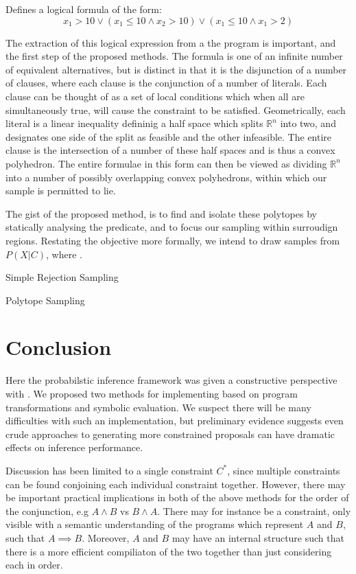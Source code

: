 Defines a logical formula of the form:
\begin{equation}
x_1 > 10 \lor (x_1 \le 10 \land x_2 > 10) \lor (x_1 \le 10 \land x_1 > 2)
\end{equation}

The extraction of this logical expression from a the program is important, and the first step of the proposed methods.
The formula is one of an infinite number of equivalent alternatives, but is distinct in that it is the disjunction of a number of clauses, where each clause is the conjunction of a number of literals.
Each clause can be thought of as a set of local conditions which when all are simultaneously true, will cause the constraint to be satisfied.
Geometrically, each literal is a linear inequality defininig a half space which splits $\mathbb{R}^n$ into two, and designates one side of the split as feasible and the other infeasible.
The entire clause is the intersection of a number of these half spaces and is thus a convex polyhedron.
The entire formulae in this form can then be viewed as dividing $\mathbb{R}^n$ into a number of possibly overlapping convex polyhedrons, within which our sample is permitted to lie.

The gist of the proposed method, is to find and isolate these polytopes by statically analysing the predicate, and to focus our sampling within surroudign regions.
Restating the objective more formally, we intend to draw samples from $P(X \vert C)$, where   .

Simple Rejection Sampling

Polytope Sampling


\section{Conclusion}
Here the probabilstic inference framework  was given a constructive perspective with .
We proposed two methods for implementing  based on program transformations and symbolic evaluation.
We suspect there will be many difficulties with such an implementation, but preliminary evidence suggests even crude approaches to generating more constrained proposals can have dramatic effects on inference performance.

Discussion has been limited to a single constraint $C^*$, since multiple constraints can be found conjoining each individual constraint together.
However, there may be important practical implications in both of the above methods for the order of the conjunction, e.g $A \land B$ vs $B \land A$.
There may for instance be a constraint, only visible with a semantic understanding of the programs which represent $A$ and $B$, such that $A \implies B$.
Moreover, $A$ and $B$ may have an internal structure such that there is a more efficient compiliaton of the two together than just considering each in order.

